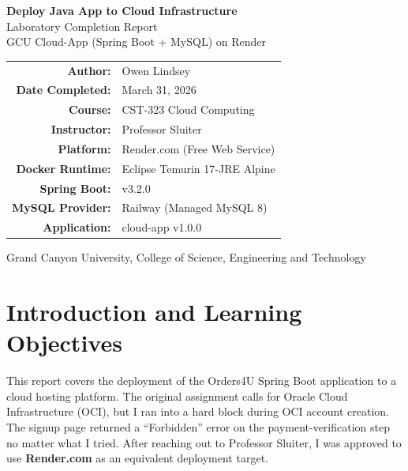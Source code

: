 \documentclass[11pt,letterpaper]{article}
\begin{document}
\begin{titlepage}
\centering
\vspace*{2cm}
{\Huge\bfseries Deploy Java App to Cloud Infrastructure\\[6pt]}
{\LARGE Laboratory Completion Report\\[12pt]}
{\Large GCU Cloud-App (Spring Boot + MySQL) on Render\\[24pt]}

\begin{tabular}{@{}rl@{}}
\textbf{Author:}            & Owen Lindsey \\
\textbf{Date Completed:}    & March 31, 2026 \\
\textbf{Course:}            & CST-323 Cloud Computing \\
\textbf{Instructor:}        & Professor Sluiter \\
\textbf{Platform:}          & Render.com (Free Web Service) \\
\textbf{Docker Runtime:}    & Eclipse Temurin 17-JRE Alpine \\
\textbf{Spring Boot:}       & v3.2.0 \\
\textbf{MySQL Provider:}    & Railway (Managed MySQL 8) \\
\textbf{Application:}       & cloud-app v1.0.0 \\
\end{tabular}

\vfill
{\small Grand Canyon University, College of Science, Engineering and Technology}
\end{titlepage}

\tableofcontents
\vspace{12pt}

\section{Introduction and Learning Objectives}

This report covers the deployment of the Orders4U Spring Boot application to a cloud hosting platform. The original assignment calls for Oracle Cloud Infrastructure (OCI), but I ran into a hard block during OCI account creation. The signup page returned a ``Forbidden'' error on the payment-verification step no matter what I tried. After reaching out to Professor Sluiter, I was approved to use \textbf{Render.com} as an equivalent deployment target.
\end{document}
